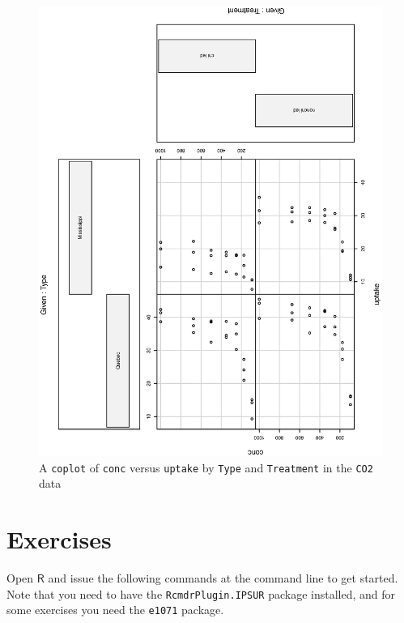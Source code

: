\documentclass[captions=tableheading]{scrbook}
\begin{document}
\begin{figure}[th]
  \includegraphics[angle=270, totalheight=4in]{ps/datadesc/coplot.ps}
  \caption[A \texttt{coplot} of \texttt{conc} versus \texttt{uptake} by \texttt{Type} and \texttt{Treatment}]{A \texttt{coplot} of \texttt{conc} versus \texttt{uptake} by \texttt{Type} and \texttt{Treatment} in the \texttt{CO2} data}
  \label{fig-coplot}
\end{figure}



\newpage{}
\section{Exercises}
\label{sec-3-7}

\setcounter{thm}{0}

Open \(\mathsf{R}\) and issue the following commands at the command line to get started. Note that you need to have the \texttt{RcmdrPlugin.IPSUR} package installed, and for some exercises you need the \texttt{e1071} package.
\end{document}
